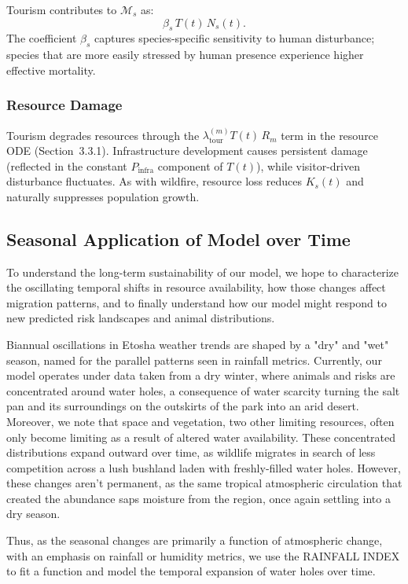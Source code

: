 Tourism contributes to $\mathcal{M}_s$ as:
\[
\beta_s\,T(t)\,N_s(t).
\]
The coefficient $\beta_s$ captures species-specific sensitivity to human disturbance; species that are more easily stressed by human presence experience higher effective mortality.

\subsubsection{Resource Damage}

Tourism degrades resources through the $\lambda_{\text{tour}}^{(m)} T(t)\,R_m$ term in the resource ODE (Section~3.3.1). Infrastructure development causes persistent damage (reflected in the constant $P_{\text{infra}}$ component of $T(t)$), while visitor-driven disturbance fluctuates. As with wildfire, resource loss reduces $K_s(t)$ and naturally suppresses population growth.

\subsection{Seasonal Application of Model over Time}

To understand the long-term sustainability of our model, we hope to characterize the oscillating temporal shifts in resource availability, how those changes affect migration patterns, and to finally understand how our model might respond to new predicted risk landscapes and animal distributions. 

Biannual oscillations in Etosha weather trends are shaped by a "dry" and "wet" season, named for the parallel patterns seen in rainfall metrics. Currently, our model operates under data taken from a dry winter, where animals and risks are concentrated around water holes, a consequence of water scarcity turning the salt pan and its surroundings on the outskirts of the park into an arid desert. Moreover, we note that space and vegetation, two other limiting resources, often only become limiting as a result of altered water availability. These concentrated distributions expand outward over time, as wildlife migrates in search of less competition across a lush bushland laden with freshly-filled water holes. However, these changes aren't permanent, as the same tropical atmospheric circulation that created the abundance saps moisture from the region, once again settling into a dry season. 

Thus, as the seasonal changes are primarily a function of atmospheric change, with an emphasis on rainfall or humidity metrics, we use the RAINFALL INDEX to fit a function and model the temporal expansion of water holes over time. 

